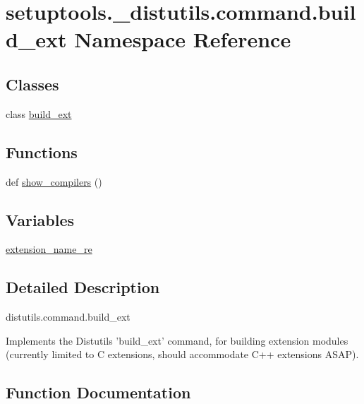 \hypertarget{namespacesetuptools_1_1__distutils_1_1command_1_1build__ext}{}\section{setuptools.\+\_\+distutils.\+command.\+build\+\_\+ext Namespace Reference}
\label{namespacesetuptools_1_1__distutils_1_1command_1_1build__ext}
\subsection*{Classes}
\begin{DoxyCompactItemize}
\item 
class \hyperlink{classsetuptools_1_1__distutils_1_1command_1_1build__ext_1_1build__ext}{build\+\_\+ext}
\end{DoxyCompactItemize}
\subsection*{Functions}
\begin{DoxyCompactItemize}
\item 
def \hyperlink{namespacesetuptools_1_1__distutils_1_1command_1_1build__ext_a6d9bd029dc10007c067fc579d7b510c7}{show\+\_\+compilers} ()
\end{DoxyCompactItemize}
\subsection*{Variables}
\begin{DoxyCompactItemize}
\item 
\hyperlink{namespacesetuptools_1_1__distutils_1_1command_1_1build__ext_add7a7e4ac762af906f1107c153894781}{extension\+\_\+name\+\_\+re}
\end{DoxyCompactItemize}


\subsection{Detailed Description}
\begin{DoxyVerb}distutils.command.build_ext

Implements the Distutils 'build_ext' command, for building extension
modules (currently limited to C extensions, should accommodate C++
extensions ASAP).\end{DoxyVerb}
 

\subsection{Function Documentation}
\mbox{\label{namespacesetuptools_1_1__distutils_1_1command_1_1build__ext_a6d9bd029dc10007c067fc579d7b510c7}} 

